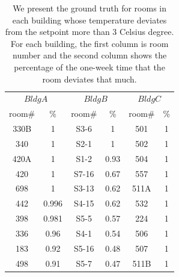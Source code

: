 \begin{table}[ht!]
 \begin{center}
	\begin{tabular}{|c|c|c|c|c|c|}
	\multicolumn{2}{c}{$Bldg A$}
	 & \multicolumn{2}{c}{$Bldg B$}
	  & \multicolumn{2}{c}{$Bldg C$} \\
	\cline{1-6} 
	 room\# & \% & room\# & \% & room\# & \%\\
	\cline{1-6}
	 330B & 1 & S3-6 & 1 & 501 & 1\\
	\cline{1-6}
	 340 & 1 & S2-1 & 1 & 502 & 1\\
	\cline{1-6}
	420A & 1 & S1-2 & 0.93 & 504 & 1\\
	\cline{1-6}
	420 & 1 & S7-16 & 0.67 & 557 & 1\\
	\cline{1-6}
	698 & 1 & S3-13 & 0.62 & 511A & 1\\
	\cline{1-6}
	442 & 0.996 & S4-15 & 0.62 & 532 & 1\\
	\cline{1-6}
	398 & 0.981 & S5-5 & 0.57 & 224 & 1\\
	\cline{1-6}
	336 & 0.96 & S4-1 & 0.54 & 506 & 1\\
	\cline{1-6}
	183 & 0.92 & S5-16 & 0.48 & 507 & 1\\
	\cline{1-6}
	498 & 0.91 & S5-7 & 0.47 & 511B & 1\\
	\cline{1-6}
	\end{tabular}
 \end{center}
 \caption{We present the ground truth for rooms in each building whose temperature deviates from the setpoint more than 3 Celsius degree. For each building, the first column is room number and the second column shows the percentage of the one-week time that the room deviates that much.}
 \label{tab:cluster}
\end{table}

